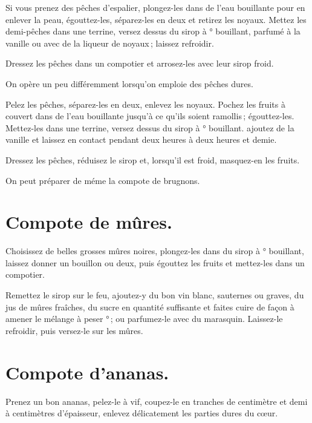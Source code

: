 Si vous prenez des pêches d'espalier, plongez-les dans de l'eau bouillante pour
en enlever la peau, égouttez-les, séparez-les en deux et retirez les noyaux.
Mettez les demi-pêches dans une terrine, versez dessus du sirop à {\mmm}°
bouillant, parfumé à la vanille ou avec de la liqueur de noyaux ; laissez
refroidir.

Dressez les pêches dans un compotier et arrosez-les avec leur sirop froid.

\medskip

On opère un peu différemment lorsqu'on emploie des pêches dures.

Pelez les pêches, séparez-les en deux, enlevez les noyaux. Pochez les fruits
à couvert dans de l'eau bouillante jusqu'à ce qu'ils soient ramollis ;
égouttez-les. Mettez-les dans une terrine, versez dessus du sirop
à {\mmm}° bouillant. ajoutez de la vanille et laissez en contact pendant
deux heures à deux heures et demie.

Dressez les pêches, réduisez le sirop et, lorsqu'il est froid, masquez-en les fruits.

\sk

On peut préparer de méme la compote de brugnons.

\section*{\centering Compote de mûres.}
{}

Choisissez de belles grosses mûres noires, plongez-les dans du sirop
à {\mmm}° bouillant, laissez donner un bouillon ou deux, puis égouttez
les fruits et mettez-les dans un compotier.

Remettez le sirop sur le feu, ajoutez-y du bon vin blanc, sauternes ou graves,
du jus de mûres fraîches, du sucre en quantité suffisante et faites cuire de
façon à amener le mélange à peser {\mmm}° ; ou parfumez-le avec du
marasquin. Laissez-le refroidir, puis versez-le sur les mûres.

\section*{\centering Compote d'ananas.}
{}

Prenez un bon ananas, pelez-le à vif, coupez-le en tranches de {\mmm}
centimètre et demi à {\mmm} centimètres d'épaisseur, enlevez délicatement
les parties dures du cœur.

